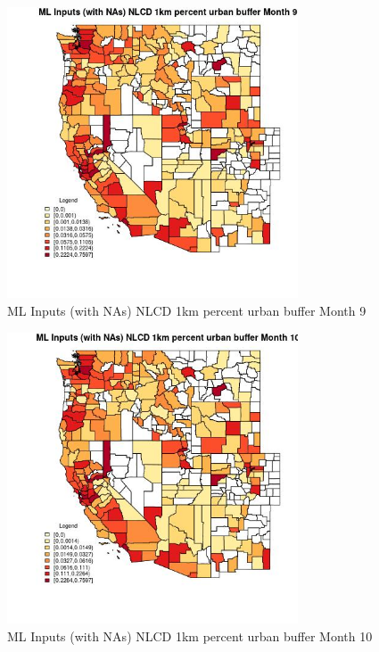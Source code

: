 \clearpage 

\begin{figure} 
\centering  
\includegraphics[width=0.77\textwidth]{Code_Outputs/Report_ML_input_PM25_Step4_part_e_de_duplicated_aves_compiled_2019-05-21wNAs_CountyNLCD_1km_percent_urban_buffermedianMonth9.jpg} 
\caption{\label{fig:Report_ML_input_PM25_Step4_part_e_de_duplicated_aves_compiled_2019-05-21wNAsCountyNLCD_1km_percent_urban_buffermedianMonth9}ML Inputs (with NAs) NLCD 1km percent urban buffer Month 9} 
\end{figure} 
 

\begin{figure} 
\centering  
\includegraphics[width=0.77\textwidth]{Code_Outputs/Report_ML_input_PM25_Step4_part_e_de_duplicated_aves_compiled_2019-05-21wNAs_CountyNLCD_1km_percent_urban_buffermedianMonth10.jpg} 
\caption{\label{fig:Report_ML_input_PM25_Step4_part_e_de_duplicated_aves_compiled_2019-05-21wNAsCountyNLCD_1km_percent_urban_buffermedianMonth10}ML Inputs (with NAs) NLCD 1km percent urban buffer Month 10} 
\end{figure} 
 

